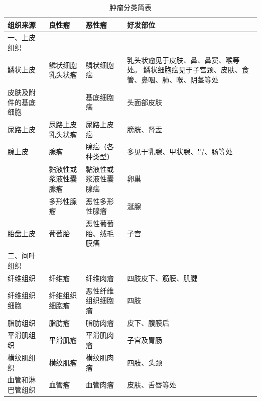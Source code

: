 \begin{longtable}[]{lm{3cm}m{3cm}m{3cm}}
  \caption{肿瘤分类简表}
  \label{tab5-1}                                                                                                                      \\
  \toprule
  组织来源                   & 良性瘤               & 恶性瘤               & 好发部位
  \\
  \midrule
  一、上皮组织               &                      &                      &
  \\\hline
  \quad 鳞状上皮             &
  鳞状细胞乳头状瘤           & 鳞状细胞癌           &
  乳头状瘤见于皮肤、鼻、鼻窦、喉等处。
  鳞状细胞癌见于子宫颈、皮肤、食管、鼻咽、肺、喉、阴茎等处
  \\\hline
  \quad 皮肤及附件的基底细胞 &                      & 基底细胞癌           & 头面部皮肤
  \\\hline
  \quad 尿路上皮             & 尿路上皮乳头状瘤     & 尿路上皮癌           & 膀胱、肾盂
  \\\hline
  \quad 腺上皮               & 腺瘤                 & 腺癌（各种类型）     & 多见于乳腺、甲状腺、胃、肠等处
  \\\hline
                             & 黏液性或浆液性囊腺瘤 & 黏液性或浆液性囊腺癌 & 卵巢
  \\\hline
                             & 多形性腺瘤           & 恶性多形性腺瘤       & 涎腺
  \\\hline
  \quad 胎盘上皮             & 葡萄胎               & 恶性葡萄胎、绒毛膜癌 & 子宫
  \\\hline
  二、间叶组织               &                      &                      &
  \\\hline
  \quad 纤维组织             & 纤维瘤               & 纤维肉瘤             & 四肢皮下、筋膜、肌腱
  \\\hline
  \quad 纤维组织细胞         & 纤维组织细胞瘤       & 恶性纤维组织细胞瘤   & 四肢
  \\\hline
  \quad 脂肪组织             & 脂肪瘤               & 脂肪肉瘤             & 皮下、腹膜后
  \\\hline
  \quad 平滑肌组织           & 平滑肌瘤             & 平滑肌肉瘤           & 子宫及胃肠
  \\\hline
  \quad 横纹肌组织           & 横纹肌瘤             & 横纹肌肉瘤           & 四肢、头颈
  \\\hline
  \quad 血管和淋巴管组织     & 血管瘤               & 血管肉瘤             & 皮肤、舌唇等处
  \\\hline

\end{longtable}
